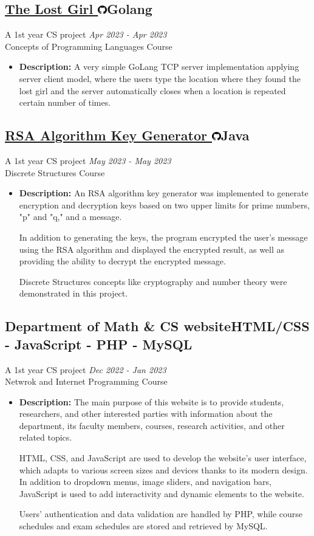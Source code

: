 \documentclass[a4paper,12pt]{article}
\newcommand{\projectTitle}[3]{%
    \subsection{\href{#2}{#1 \includegraphics[height=11pt]{images/github-logo.png}}\textmd{\hfill \normalsize{#3}}}
}
\begin{document}
		\projectTitle{The Lost Girl}{https://github.com/OmarMGaber/TheLostGirl}{Golang}
			\vspace{-3mm}
			A 1st year CS project \hfill \small\textit{Apr 2023 - Apr 2023}\\
			Concepts of Programming Languages Course
			\begin{itemize}
				\item{\textbf{Description: } A very simple GoLang TCP server implementation applying server client model, where the users type the location where they found the lost girl and the server automatically closes when a location is repeated certain number of times.}
			\end{itemize}

		\projectTitle{RSA Algorithm Key Generator}{https://github.com/OmarMGaber/RSA-Implementation}{Java}
			\vspace{-3mm}
			A 1st year CS project \hfill \small\textit{May 2023 - May 2023}\\
			Discrete Structures Course
			\begin{itemize}
				\item{\textbf{Description: }An RSA algorithm key generator was implemented to generate encryption and decryption keys based on two upper limits for prime numbers, "p" and "q," and a message.

In addition to generating the keys, the program encrypted the user's message using the RSA algorithm and displayed the encrypted result, as well as providing the ability to decrypt the encrypted message.

Discrete Structures concepts like cryptography and number theory were demonstrated in this project.}
			\end{itemize}	
	
		 \subsection{{Department of Math \& CS website}\textmd{\hfill \normalsize{HTML/CSS - JavaScript - PHP - MySQL}}}
			\vspace{-3mm}
			A 1st year CS project \hfill \small\textit{Dec 2022 - Jan 2023}\\
			Netwrok and Internet Programming Course
			\begin{itemize}
				\item{\textbf{Description: }The main purpose of this website is to provide students, researchers, and other interested parties with information about the department, its faculty members, courses, research activities, and other related topics.


HTML, CSS, and JavaScript are used to develop the website's user interface, which adapts to various screen sizes and devices thanks to its modern design. In addition to dropdown menus, image sliders, and navigation bars, JavaScript is used to add interactivity and dynamic elements to the website.

Users' authentication and data validation are handled by PHP, while course schedules and exam schedules are stored and retrieved by MySQL.}
			\end{itemize}
		
\end{document}
